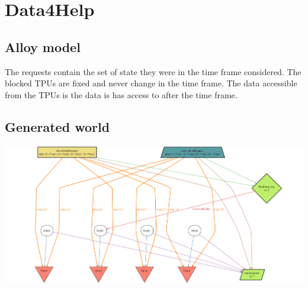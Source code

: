 \section{Data4Help}
\subsection{Alloy model}
The requests contain the set of state they were in the time frame considered.
The blocked TPUs are fixed and never change in the time frame.
The data accessible from the TPUs is the data is has access to after the time frame.

\subsection{Generated world}
\includegraphics[width = \textheight, angle=90]{sections/alloy/GenWorldD4H.png}
